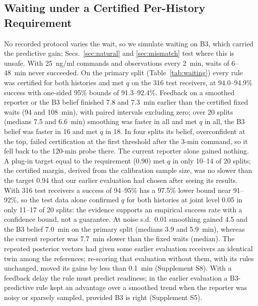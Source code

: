 \documentclass[conference]{IEEEtran}
\begin{document}
\subsection{Waiting under a Certified Per-History Requirement}
\label{sec:waiting}
No recorded protocol varies the wait, so we simulate waiting on B3, which carried the predictive gain; Secs.~\ref{sec:natural} and \ref{sec:mismatch} test where this is unsafe. With 25~ng/ml commands and observations every 2~min, waits of 6--48~min never succeeded. On the primary split (Table~\ref{tab:waiting}) every rule was certified for both histories and met $q$ on the 316 test receivers, at 94.0--94.9\% success with one-sided 95\% bounds of 91.3--92.4\%. Feedback on a smoothed reporter or the B3 belief finished 7.8 and 7.3~min earlier than the certified fixed waits (94 and 108~min), with paired intervals excluding zero; over 20 splits (medians 7.5 and 6.6~min) smoothing was faster in all and met $q$ in all, the B3 belief was faster in 16 and met $q$ in 18. In four splits its belief, overconfident at the top, failed certification at the first threshold after the 3-min command, so it fell back to the 120-min probe there. The current reporter alone gained nothing. A plug-in target equal to the requirement (0.90) met $q$ in only 10--14 of 20 splits; the certified margin, derived from the calibration sample size, was no slower than the target 0.94 that our earlier evaluation had chosen after seeing its results. With 316 test receivers a success of 94--95\% has a 97.5\% lower bound near 91--92\%, so the test data alone confirmed $q$ for both histories at joint level 0.05 in only 11--17 of 20 splits: the evidence supports an empirical success rate with a confidence bound, not a guarantee. At noise s.d.\ 0.01 smoothing gained 4.5 and the B3 belief 7.0~min on the primary split (medians 3.9 and 5.9~min), whereas the current reporter was 7.7~min slower than the fixed waits (median). The repeated posterior vectors had given some earlier evaluation receivers an identical twin among the references; re-scoring that evaluation without them, with its rules unchanged, moved its gains by less than 0.1~min (Supplement S8). With a feedback delay the rule must predict readiness; in the earlier evaluation a B3-predictive rule kept an advantage over a smoothed trend when the reporter was noisy or sparsely sampled, provided B3 is right (Supplement S5).

\begin{table}[t]
\caption{From prediction to decision (B3 simulation, medians over 20 splits): 10-min reporter forecast error $e_{10}$ and error $e_\rho$ of the recovery statistic at 60--120~min ($\times10^{-3}$), Brier score ($\times10^{-3}$), false-ready rate after the 3/30-min command, completion $T$ and $\Delta T$ against certified fixed waits (min).}
\label{tab:decide}
\centering\footnotesize\setlength{\tabcolsep}{1.8pt}

\end{table}
\end{document}
